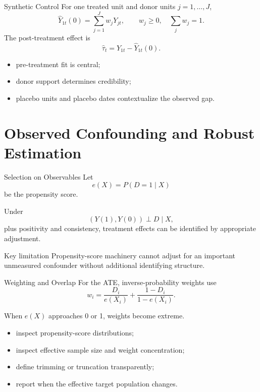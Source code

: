 \documentclass[aspectratio=169,11pt]{beamer}
\begin{document}
\begin{frame}{Synthetic Control}
For one treated unit and donor units \(j=1,\ldots,J\),
\[
\widehat{Y}_{1t}(0)=\sum_{j=1}^{J}w_jY_{jt},
\qquad
w_j\geq 0,\quad \sum_jw_j=1.
\]
The post-treatment effect is
\[
\widehat{\tau}_t=Y_{1t}-\widehat{Y}_{1t}(0).
\]

\begin{itemize}
\item pre-treatment fit is central;
\item donor support determines credibility;
\item placebo units and placebo dates contextualize the observed gap.
\end{itemize}
\end{frame}

\section{Observed Confounding and Robust Estimation}

\begin{frame}{Selection on Observables}
Let
\[
e(X)=P(D=1\mid X)
\]
be the propensity score.

Under
\[
(Y(1),Y(0))\perp D\mid X,
\]
plus positivity and consistency, treatment effects can be identified by appropriate adjustment.

\begin{alertblock}{Key limitation}
Propensity-score machinery cannot adjust for an important unmeasured confounder without additional identifying structure.
\end{alertblock}
\end{frame}

\begin{frame}{Weighting and Overlap}
For the ATE, inverse-probability weights use
\[
w_i=\frac{D_i}{e(X_i)}+\frac{1-D_i}{1-e(X_i)}.
\]

When \(e(X)\) approaches 0 or 1, weights become extreme.

\begin{itemize}
\item inspect propensity-score distributions;
\item inspect effective sample size and weight concentration;
\item define trimming or truncation transparently;
\item report when the effective target population changes.
\end{itemize}
\end{frame}
\end{document}
